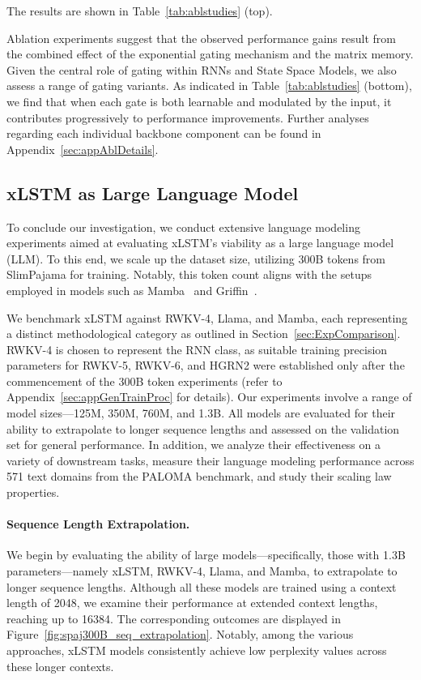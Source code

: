 The results are shown in Table~\ref{tab:ablstudies} (top). 

Ablation experiments suggest that the observed performance gains result from the combined effect of the exponential gating mechanism and the matrix memory. Given the central role of gating within RNNs and State Space Models, we also assess a range of gating variants. As indicated in Table~\ref{tab:ablstudies} (bottom), we find that when each gate is both learnable and modulated by the input, it contributes progressively to performance improvements. Further analyses regarding each individual backbone component can be found in Appendix~\ref{sec:appAblDetails}.

\subsection{xLSTM as Large Language Model}
\label{sec:ExpLanguage}

To conclude our investigation, we conduct extensive language modeling experiments aimed at evaluating xLSTM’s viability as a large language model (LLM). To this end, we scale up the dataset size, utilizing 300B tokens from SlimPajama for training. Notably, this token count aligns with the setups employed in models such as Mamba~\citep{Gu:24arxiv} and Griffin~\citep{De:24arxiv}.

We benchmark xLSTM against RWKV-4, Llama, and Mamba, each representing a distinct methodological category as outlined in Section~\ref{sec:ExpComparison}. RWKV-4 is chosen to represent the RNN class, as suitable training precision parameters for RWKV-5, RWKV-6, and HGRN2 were established only after the commencement of the 300B token experiments (refer to Appendix~\ref{sec:appGenTrainProc} for details). Our experiments involve a range of model sizes—125M, 350M, 760M, and 1.3B. All models are evaluated for their ability to extrapolate to longer sequence lengths and assessed on the validation set for general performance. In addition, we analyze their effectiveness on a variety of downstream tasks, measure their language modeling performance across 571 text domains from the PALOMA benchmark, and study their scaling law properties.

\paragraph{Sequence Length Extrapolation.}
\label{sec:spaj300B_ctx_extrapolation}
We begin by evaluating the ability of large models—specifically, those with 1.3B parameters—namely xLSTM, RWKV-4, Llama, and Mamba, to extrapolate to longer sequence lengths. Although all these models are trained using a context length of 2048, we examine their performance at extended context lengths, reaching up to 16384. The corresponding outcomes are displayed in Figure~\ref{fig:spaj300B_seq_extrapolation}. Notably, among the various approaches, xLSTM models consistently achieve low perplexity values across these longer contexts.

